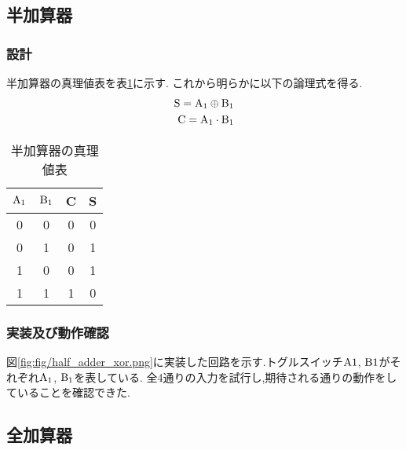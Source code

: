 \subsection{半加算器}
\subsubsection{設計}
半加算器の真理値表を表\ref{tab:half_addr}に示す.
これから明らかに以下の論理式を得る.
\begin{align}
  \begin{split}
    {\rm S}={\rm A}_1\oplus{\rm B}_1\\
    {\rm C}={\rm A}_1\cdot{\rm B}_1
  \end{split}
\end{align}
\begin{table}[h]
  \centering
  \begin{tabular}{cc|cc}
    \hline
    $\rm A_1$ & $\rm B_1$ & C & S\\
    \hline
    0 & 0 & 0 & 0 \\
    0 & 1 & 0 & 1 \\
    1 & 0 & 0 & 1 \\
    1 & 1 & 1 & 0 \\
    \hline
  \end{tabular}
  \caption{半加算器の真理値表}
  \label{tab:half_addr}
\end{table}
\newpage
\subsubsection{実装及び動作確認}
図\ref{fig:fig/half_adder_xor.png}に実装した回路を示す.トグルスイッチ$\rm A1$, $\rm B1$がそれぞれ${\rm A}_1$, ${\rm B}_1$を表している.
全4通りの入力を試行し,期待される通りの動作をしていることを確認できた.
\subsection{全加算器}
